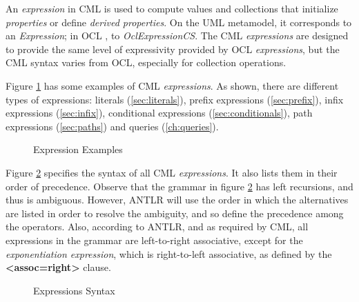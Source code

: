 An \emph{expression} in CML is used to compute values and collections that initialize \emph{properties} or define \emph{derived properties}.
On the UML \cite{uml} metamodel,
it corresponds to an \emph{Expression};
in OCL \cite{ocl}, to \emph{OclExpressionCS}.
The CML \emph{expressions} are designed to provide the same level of
expressivity provided by OCL \emph{expressions},
but the CML syntax varies from OCL, especially for collection operations.

\begin{examples}
Figure \ref{fig:ex:expressions} has some examples of CML \emph{expressions}.
As shown, there are different types of expressions:
literals (\ref{sec:literals}),
prefix expressions (\ref{sec:prefix}),
infix expressions (\ref{sec:infix}),
conditional expressions (\ref{sec:conditionals}),
path expressions (\ref{sec:paths})
and queries (\ref{ch:queries}).
\end{examples}

\begin{figure}
\verbatimfont{\small}

\caption{Expression Examples}
\label{fig:ex:expressions}
\end{figure}

\begin{concrete-syntax}
Figure \ref{fig:stx:expressions} specifies the syntax of all CML \emph{expressions}. It also lists them in their order of precedence.
Observe that the grammar in figure \ref{fig:stx:expressions} has left
recursions, and thus is ambiguous.
However, ANTLR \cite{antlr} will use the order in which the alternatives
are listed in order to resolve the ambiguity,
and so define the precedence among the operators.
Also, according to ANTLR,
and as required by CML,
all expressions in the grammar are left-to-right associative,
except for the \emph{exponentiation expression},
which is right-to-left associative,
as defined by the \textbf{<assoc=right>} clause.
\end{concrete-syntax}

\begin{figure}
\verbatimfont{\small}

\caption{Expressions Syntax}
\label{fig:stx:expressions}
\end{figure}

